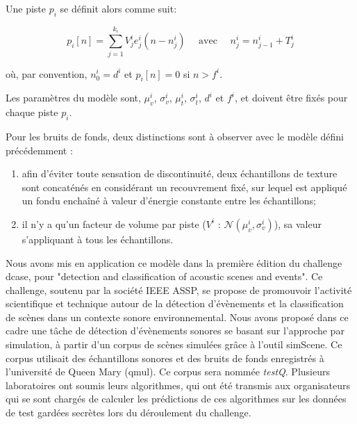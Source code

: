   Une piste $p_i$ se définit alors comme suit:

  \begin{equation}
    \label{eq:ch4_eq2}
    p_{i}[n]= \sum_{j=1}^{k_i} V_j^i e_j^i(n-n_j^i) \quad \textrm{ avec } \quad n_j^i=n_{j-1}^i + T_j^i
  \end{equation}

  où, par convention, $n^i_0=d^i$ et $p_i[n]=0$ si $n>f^i$.

  Les paramètres du modèle sont, $\mu_v^i$, $\sigma_v^i$, $\mu_t^i$, $\sigma_t^i$, $d^i$ et $f^i$, et doivent être fixés pour chaque piste $p_i$. %

  Pour les bruits de fonds, deux distinctions sont à observer avec le modèle défini précédemment :

  \begin{enumerate}
    \item afin d'éviter toute sensation de discontinuité, deux échantillons de texture sont concaténés en considérant un recouvrement fixé, sur lequel est appliqué un fondu enchaîné à valeur d'énergie constante entre les échantillons;
    \item il n'y a qu'un facteur de volume par piste ($V^i \textrm{ : } \mathcal{N}(\mu_v^{i},\sigma_v^{i})$), sa valeur s'appliquant à tous les échantillons.
  \end{enumerate}


  Nous avons mis en application ce modèle dans la première édition du challenge dcase, pour "detection and classification of acoustic scenes and events". Ce challenge, soutenu par la société IEEE ASSP, se propose de promouvoir l'activité scientifique et technique autour de la détection d'évènements et la classification de scènes dans un contexte sonore environnemental. Nous avons proposé dans ce cadre une tâche de détection d'évènements sonores se basant sur l'approche par simulation, à partir d'un corpus de scènes simulées grâce à l'outil simScene. Ce corpus utilisait des échantillons sonores et des bruits de fonds enregistrés à l'université de Queen Mary (qmul). Ce corpus sera nommée \emph{testQ}. Plusieurs laboratoires ont soumis leurs algorithmes, qui ont été transmis aux organisateurs qui se sont chargés de calculer les prédictions de ces algorithmes sur les données de test gardées secrètes lors du déroulement du challenge.

